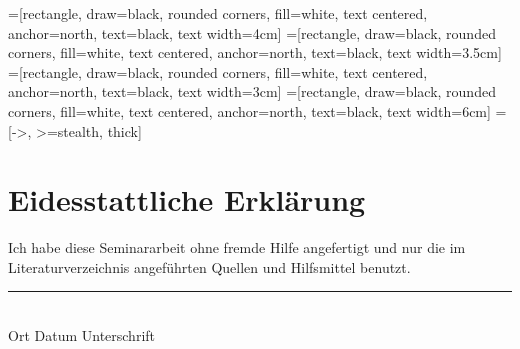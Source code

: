 \documentclass[oneside,a4paper,12pt,pagestyleset=standard,titlepage,parskip=full,bibliography=totoc]{scrbook}
\begin{document}

\clearpage
\tableofcontents
\clearpage
	=[rectangle, draw=black, rounded corners, fill=white, text centered, anchor=north, text=black, text width=4cm]
	=[rectangle, draw=black, rounded corners, fill=white, text centered, anchor=north, text=black, text width=3.5cm]
	=[rectangle, draw=black, rounded corners, fill=white, text centered, anchor=north, text=black, text width=3cm]
	=[rectangle, draw=black, rounded corners, fill=white, text centered, anchor=north, text=black, text width=6cm]
	=[->, >=stealth, thick]


%
%
%

\appendix


\clearpage
\printbibliography

\clearpage
\thispagestyle{empty}
\section*{Eidesstattliche Erklärung}
Ich habe diese Seminararbeit ohne fremde Hilfe angefertigt und nur die im Literaturverzeichnis angef\"uhrten Quellen und Hilfsmittel benutzt.

\vspace{2cm}
\rule{\textwidth}{0.5pt}\\
Ort \hspace{3cm} Datum \hspace{3cm} Unterschrift
\end{document}
